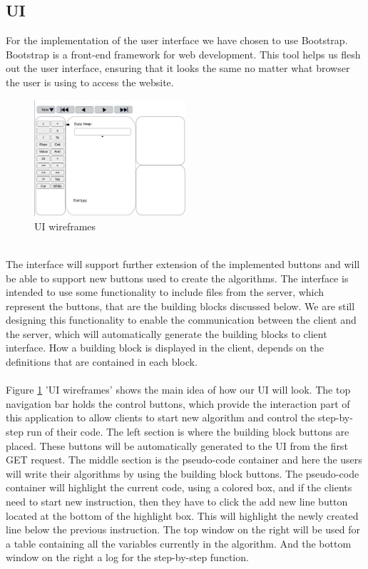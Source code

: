 \documentclass[11pt]{article}
\begin{document}
\subsection{UI}
For the implementation of the user interface we have chosen to use Bootstrap. Bootstrap is a front-end framework for web development. This tool helps us flesh out the user interface, ensuring that it looks the same no matter what browser the user is using to access the website.\\
\begin{figure} %
    \centering
    \includegraphics[width=0.5\textwidth]{img/ui_1.png}
    \caption{UI wireframes}
    \label{uiframes}
\end{figure}
\\
The interface will support further extension of the implemented buttons and will be able to support new buttons used to create the algorithms. The interface is intended to use some functionality to include files from the server, which represent the buttons, that are the building blocks discussed below. We are still designing this functionality to enable the communication between the client and the server, which will automatically generate the building blocks to client interface. How a building block is displayed in the client, depends on the definitions that are contained in each block.\\\\
Figure \ref{uiframes} 'UI wireframes' shows the main idea of how our UI will look. The top navigation bar holds the control buttons, which provide the interaction part of this application to allow clients to start new algorithm and control the step-by-step run of their code.
The left section is where the building block buttons are placed. These buttons will be automatically generated to the UI from the first GET request. The middle section is the pseudo-code container and here the users will write their algorithms by using the building block buttons. The pseudo-code container will highlight the current code, using a colored box, and if the clients need to start new instruction, then they have to click the add new line button located at the bottom of the highlight box. This will highlight the newly created line below the previous instruction. The top window on the right will be used for a table containing all the variables currently in the algorithm. And the bottom window on the right a log for the step-by-step function.
\end{document}
